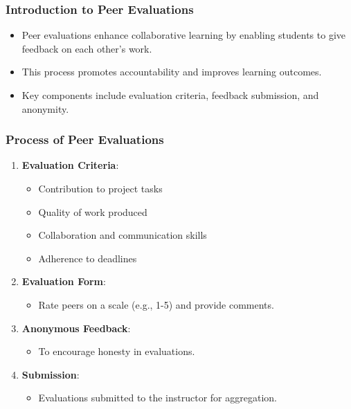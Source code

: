\documentclass[aspectratio=169]{beamer}
\begin{document}
\begin{frame}[fragile]
    \frametitle{Introduction to Peer Evaluations}
    \begin{itemize}
        \item Peer evaluations enhance collaborative learning by enabling students to give feedback on each other's work.
        \item This process promotes accountability and improves learning outcomes.
        \item Key components include evaluation criteria, feedback submission, and anonymity.
    \end{itemize}
\end{frame}

\begin{frame}[fragile]
    \frametitle{Process of Peer Evaluations}
    \begin{enumerate}
        \item \textbf{Evaluation Criteria}:
            \begin{itemize}
                \item Contribution to project tasks
                \item Quality of work produced
                \item Collaboration and communication skills
                \item Adherence to deadlines
            \end{itemize}
        \item \textbf{Evaluation Form}:
            \begin{itemize}
                \item Rate peers on a scale (e.g., 1-5) and provide comments.
            \end{itemize}
        \item \textbf{Anonymous Feedback}:
            \begin{itemize}
                \item To encourage honesty in evaluations.
            \end{itemize}
        \item \textbf{Submission}:
            \begin{itemize}
                \item Evaluations submitted to the instructor for aggregation.
            \end{itemize}
    \end{enumerate}
\end{frame}
\end{document}
